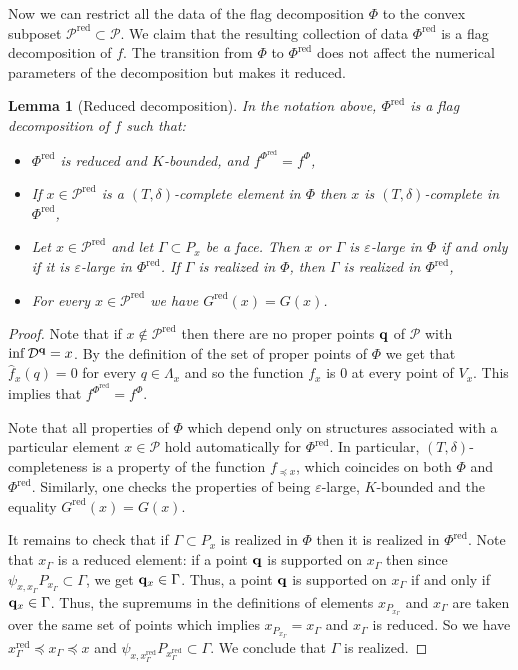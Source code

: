 \documentclass{daj}
\newcommand{\D}{\mathcal D}
\renewcommand{\P}{\mathcal P}
\newtheorem{lemma}[theorem]{Lemma}
\theoremstyle{definition}
\theoremstyle{remark}
\theoremstyle{definition}
\theoremstyle{definition}
\begin{document}
Now we can restrict all the data of the flag decomposition $\Phi$ to the convex subposet $\P^{\text{red}} \subset \P$. We claim that the resulting collection of data $\Phi^{\text{red}}$ is a flag decomposition of $f$. The transition from $\Phi$ to $\Phi^{\text{red}}$ does not affect the numerical parameters of the decomposition but makes it reduced.

\begin{lemma}[Reduced decomposition]\label{straig}
In the notation above, $\Phi^{\text{red}}$ is a flag decomposition of $f$ such that:
\begin{itemize}
    \item $\Phi^{\text{red}}$ is reduced and $K$-bounded, and $f^{\Phi^{\text{red}}} = f^{\Phi}$,
    \item If $x \in \P^{\text{red}}$ is a $(T, \delta)$-complete element in $\Phi$ then $x$ is $(T, \delta)$-complete in $\Phi^{\text{red}}$,
    \item Let $x \in \P^{\text{red}}$ and let $\Gamma \subset P_x$ be a face. Then $x$ or $\Gamma$ is $\varepsilon$-large in $\Phi$ if and only if it is $\varepsilon$-large in $\Phi^{\text{red}}$. If $\Gamma$ is realized in $\Phi$, then $\Gamma$ is realized in $\Phi^{\text{red}}$,
    \item For every $x \in \P^{\text{red}}$ we have $G^{\text{red}}(x) = G(x)$.
\end{itemize}
\end{lemma}

\begin{proof}
Note that if $x \not \in \P^{\text{red}}$ then there are no proper points ${\bf q}$ of $\P$ with $\inf\D^{\bf q} = x$. By the definition of the set of proper points of $\Phi$ we get that $\hat f_x(q) = 0$ for every $q \in \Lambda_x$ and so the function $f_x$ is 0 at every point of $V_x$. This implies that $f^{\Phi^{\text{red}}} = f^{\Phi}$.

Note that all properties of $\Phi$ which depend only on structures associated with a particular element $x \in \P$ hold automatically for $\Phi^{\text{red}}$. In particular, $(T, \delta)$-completeness is a property of the function $f_{\preceq x}$, which coincides on both $\Phi$ and $\Phi^{\text{red}}$. Similarly, one checks the properties of being $\varepsilon$-large, $K$-bounded and the equality $G^{\text{red}}(x) = G(x)$. 

It remains to check that if $\Gamma \subset P_x$ is realized in $\Phi$ then it is realized in $\Phi^{\text{red}}$. Note that $x_\Gamma$ is a reduced element: if a point ${\bf q}$ is supported on $x_\Gamma$ then since $\psi_{x, x_{\Gamma}} P_{x_\Gamma} \subset \Gamma$, we get ${\bf q}_x \in \Gamma$. Thus, a point ${\bf q}$ is supported on $x_\Gamma$ if and only if ${\bf q}_x \in \Gamma$. Thus, the supremums in the definitions of elements $x_{P_{x_\Gamma}}$ and $x_{\Gamma}$ are taken over the same set of points which implies $x_{P_{x_\Gamma}} = x_{\Gamma}$ and $x_{\Gamma}$ is reduced. So we have $x^{\text{red}}_\Gamma \preceq x_{\Gamma} \preceq x$ and $\psi_{x, x^{\text{red}}_\Gamma} P_{x^{\text{red}}_\Gamma} \subset \Gamma$. We conclude that $\Gamma$ is realized.
\end{proof}
\end{document}

